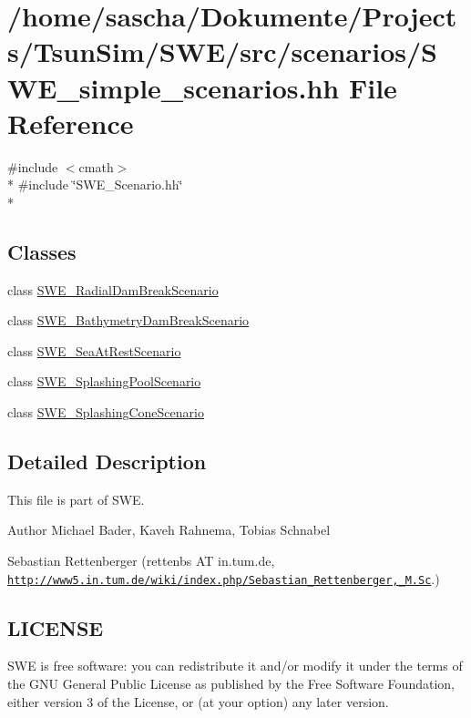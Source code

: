 \hypertarget{SWE__simple__scenarios_8hh}{\section{/home/sascha/\-Dokumente/\-Projects/\-Tsun\-Sim/\-S\-W\-E/src/scenarios/\-S\-W\-E\-\_\-simple\-\_\-scenarios.hh File Reference}
\label{SWE__simple__scenarios_8hh}
}
{\ttfamily \#include $<$cmath$>$}\\*
{\ttfamily \#include \char`\"{}S\-W\-E\-\_\-\-Scenario.\-hh\char`\"{}}\\*
\subsection*{Classes}
\begin{DoxyCompactItemize}
\item 
class \hyperlink{classSWE__RadialDamBreakScenario}{S\-W\-E\-\_\-\-Radial\-Dam\-Break\-Scenario}
\item 
class \hyperlink{classSWE__BathymetryDamBreakScenario}{S\-W\-E\-\_\-\-Bathymetry\-Dam\-Break\-Scenario}
\item 
class \hyperlink{classSWE__SeaAtRestScenario}{S\-W\-E\-\_\-\-Sea\-At\-Rest\-Scenario}
\item 
class \hyperlink{classSWE__SplashingPoolScenario}{S\-W\-E\-\_\-\-Splashing\-Pool\-Scenario}
\item 
class \hyperlink{classSWE__SplashingConeScenario}{S\-W\-E\-\_\-\-Splashing\-Cone\-Scenario}
\end{DoxyCompactItemize}


\subsection{Detailed Description}
This file is part of S\-W\-E.

\begin{DoxyAuthor}{Author}
Michael Bader, Kaveh Rahnema, Tobias Schnabel 

Sebastian Rettenberger (rettenbs A\-T in.\-tum.\-de, \href{http://www5.in.tum.de/wiki/index.php/Sebastian_Rettenberger,_M.Sc}{\tt http\-://www5.\-in.\-tum.\-de/wiki/index.\-php/\-Sebastian\-\_\-\-Rettenberger,\-\_\-\-M.\-Sc}.)
\end{DoxyAuthor}
\hypertarget{Writer_8hh_LICENSE}{}\subsection{L\-I\-C\-E\-N\-S\-E}\label{Writer_8hh_LICENSE}
S\-W\-E is free software\-: you can redistribute it and/or modify it under the terms of the G\-N\-U General Public License as published by the Free Software Foundation, either version 3 of the License, or (at your option) any later version.

